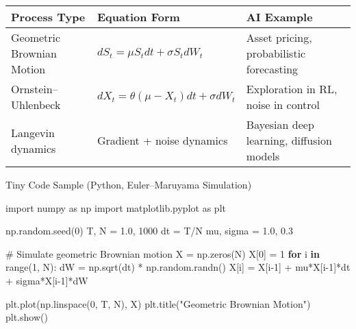 \documentclass[
  letterpaper,
  DIV=11,
  numbers=noendperiod]{scrreprt}
\newenvironment{Shaded}{\begin{snugshade}}{\end{snugshade}}
\newcommand{\BuiltInTok}[1]{\textcolor[rgb]{0.00,0.23,0.31}{#1}}
\newcommand{\CommentTok}[1]{\textcolor[rgb]{0.37,0.37,0.37}{#1}}
\newcommand{\ControlFlowTok}[1]{\textcolor[rgb]{0.00,0.23,0.31}{\textbf{#1}}}
\newcommand{\DecValTok}[1]{\textcolor[rgb]{0.68,0.00,0.00}{#1}}
\newcommand{\FloatTok}[1]{\textcolor[rgb]{0.68,0.00,0.00}{#1}}
\newcommand{\ImportTok}[1]{\textcolor[rgb]{0.00,0.46,0.62}{#1}}
\newcommand{\KeywordTok}[1]{\textcolor[rgb]{0.00,0.23,0.31}{\textbf{#1}}}
\newcommand{\NormalTok}[1]{\textcolor[rgb]{0.00,0.23,0.31}{#1}}
\newcommand{\OperatorTok}[1]{\textcolor[rgb]{0.37,0.37,0.37}{#1}}
\newcommand{\StringTok}[1]{\textcolor[rgb]{0.13,0.47,0.30}{#1}}
\begin{document}
\begin{longtable}[]{@{}
  >{\raggedright\arraybackslash}p{}
  >{\raggedright\arraybackslash}p{}
  >{\raggedright\arraybackslash}p{}@{}}
\toprule\noalign{}
\begin{minipage}[b]{\linewidth}\raggedright
Process Type
\end{minipage} & \begin{minipage}[b]{\linewidth}\raggedright
Equation Form
\end{minipage} & \begin{minipage}[b]{\linewidth}\raggedright
AI Example
\end{minipage} \\
\midrule\noalign{}
\endhead
\bottomrule\noalign{}
\endlastfoot
Geometric Brownian Motion & \(dS_t = \mu S_t dt + \sigma S_t dW_t\) &
Asset pricing, probabilistic forecasting \\
Ornstein--Uhlenbeck & \(dX_t = \theta(\mu - X_t)dt + \sigma dW_t\) &
Exploration in RL, noise in control \\
Langevin dynamics & Gradient + noise dynamics & Bayesian deep learning,
diffusion models \\
\end{longtable}

Tiny Code Sample (Python, Euler--Maruyama Simulation)

\begin{Shaded}
\begin{Highlighting}[]
\ImportTok{import}\NormalTok{ numpy }\ImportTok{as}\NormalTok{ np}
\ImportTok{import}\NormalTok{ matplotlib.pyplot }\ImportTok{as}\NormalTok{ plt}

\NormalTok{np.random.seed(}\DecValTok{0}\NormalTok{)}
\NormalTok{T, N }\OperatorTok{=} \FloatTok{1.0}\NormalTok{, }\DecValTok{1000}
\NormalTok{dt }\OperatorTok{=}\NormalTok{ T}\OperatorTok{/}\NormalTok{N}
\NormalTok{mu, sigma }\OperatorTok{=} \FloatTok{1.0}\NormalTok{, }\FloatTok{0.3}

\CommentTok{\# Simulate geometric Brownian motion}
\NormalTok{X }\OperatorTok{=}\NormalTok{ np.zeros(N)}
\NormalTok{X[}\DecValTok{0}\NormalTok{] }\OperatorTok{=} \DecValTok{1}
\ControlFlowTok{for}\NormalTok{ i }\KeywordTok{in} \BuiltInTok{range}\NormalTok{(}\DecValTok{1}\NormalTok{, N):}
\NormalTok{    dW }\OperatorTok{=}\NormalTok{ np.sqrt(dt) }\OperatorTok{*}\NormalTok{ np.random.randn()}
\NormalTok{    X[i] }\OperatorTok{=}\NormalTok{ X[i}\OperatorTok{{-}}\DecValTok{1}\NormalTok{] }\OperatorTok{+}\NormalTok{ mu}\OperatorTok{*}\NormalTok{X[i}\OperatorTok{{-}}\DecValTok{1}\NormalTok{]}\OperatorTok{*}\NormalTok{dt }\OperatorTok{+}\NormalTok{ sigma}\OperatorTok{*}\NormalTok{X[i}\OperatorTok{{-}}\DecValTok{1}\NormalTok{]}\OperatorTok{*}\NormalTok{dW}

\NormalTok{plt.plot(np.linspace(}\DecValTok{0}\NormalTok{, T, N), X)}
\NormalTok{plt.title(}\StringTok{"Geometric Brownian Motion"}\NormalTok{)}
\NormalTok{plt.show()}
\end{Highlighting}
\end{Shaded}
\end{document}
